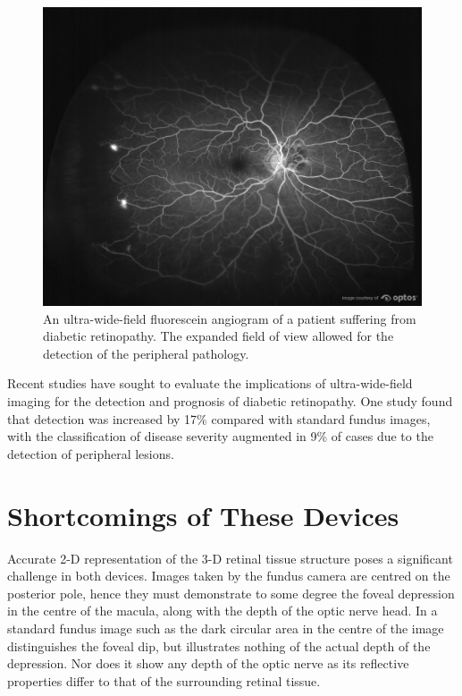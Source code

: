 \begin{figure}[htbp]
\centering
\includegraphics{figures/uwfdr}
\caption{An ultra-wide-field fluorescein angiogram of a patient suffering from diabetic retinopathy. The expanded field of view allowed for the detection of the peripheral pathology.}
\label{fig:uwfdr}
   \end{figure}

Recent studies have sought to evaluate the implications of ultra-wide-field
imaging for the detection and prognosis of diabetic retinopathy. One study
found that detection was increased by 17\% compared with standard fundus images,
with the classification of disease severity augmented in 9\% of cases due to the
detection of peripheral lesions. \cite{silva2014potential}


\section{Shortcomings of These Devices}


Accurate 2-D representation of the 3-D retinal tissue structure
poses a significant challenge in both devices. Images taken by the
fundus camera are centred on the posterior pole, hence they must
demonstrate to some degree the foveal depression in the centre of
the macula, along with the depth of the optic nerve head. In a standard
fundus image such as  the dark circular area in the
centre of the image distinguishes the foveal dip, but illustrates
nothing of the actual depth of the depression. Nor does it show any
depth of the optic nerve as its reflective properties differ to that
of the surrounding retinal tissue.

